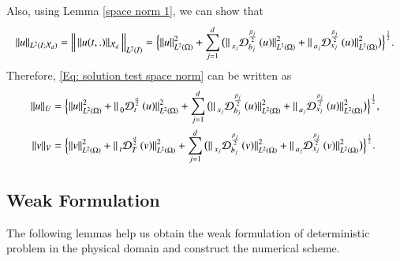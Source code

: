 %
Also, using Lemma \ref{space norm 1}, we can show that
%
\begin{align}
%
\label{space norm 3}
\Vert u \Vert_{L^2(I; \mathcal{X}_d)}
=
\Big{\Vert} \, \Vert u(t,.) \Vert_{\mathcal{X}_d}\,\Big{\Vert}_{L^2(I)}
=
\Big{\{}  \Vert u \Vert_{L^2(\Omega)}^2 + \sum_{j=1}^{d} \big( \Vert \prescript{}{x_j}{\mathcal{D}}_{b_j}^{\frac{\beta_j}{2}}\, (u)\Vert_{L^2(\Omega)}^2 
+ \Vert \prescript{}{a_j}{\mathcal{D}}_{x_j}^{\frac{\beta_j}{2}}\, (u)\Vert_{L^2(\Omega)}^2 \big) 
\Big{\}}^{\frac{1}{2}}.
%
\end{align}
%
Therefore, \eqref{Eq: solution test space norm} can be written as
%
\begin{align}
%
\label{Eq: solution space norm}
\Vert u \Vert_{U} 
&= 
\Big{\{}  \Vert u \Vert_{L^2(\Omega)}^2 + \Vert \prescript{}{0}{\mathcal{D}}_{t}^{\frac{\alpha}{2}}\, (u)\Vert_{L^2(\Omega)}^2 
+ \sum_{j=1}^{d} \big( \Vert \prescript{}{x_j}{\mathcal{D}}_{b_j}^{\frac{\beta_j}{2}}\, (u)\Vert_{L^2(\Omega)}^2+\Vert \prescript{}{a_j}{\mathcal{D}}_{x_j}^{\frac{\beta_j}{2}}\, (u)\Vert_{L^2(\Omega)}^2 \big) \Big{\}}^{\frac{1}{2}}, 
%
\\
\label{Eq: test space norm}
%
\Vert v \Vert_{V} 
& =
\Big{\{}  \Vert v \Vert_{L^2(\Omega)}^2 + \Vert \prescript{}{t}{\mathcal{D}}_{T}^{\frac{\alpha}{2}}\, (v)\Vert_{L^2(\Omega)}^2 
+ \sum_{j=1}^{d} \big( \Vert \prescript{}{x_j}{\mathcal{D}}_{b_j}^{\frac{\beta_j}{2}}\, (v)\Vert_{L^2(\Omega)}^2
+\Vert \prescript{}{a_j}{\mathcal{D}}_{x_j}^{\frac{\beta_j}{2}}\, (v)\Vert_{L^2(\Omega)}^2 \big) \Big{\}}^{\frac{1}{2}}.
%
\end{align}
%















%
%
\subsection{Weak Formulation}
\label{Sec: weak formulation}
%
%
The following lemmas help us obtain the weak formulation of deterministic problem in the physical domain and construct the numerical scheme.

